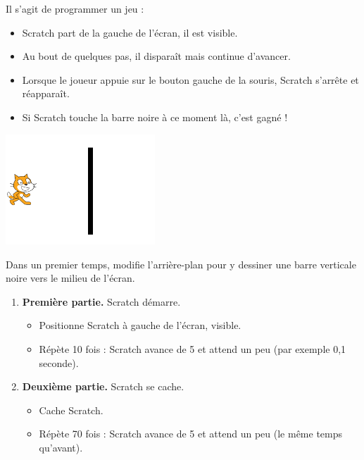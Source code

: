 \documentclass[class=report,crop=false, 12pt]{standalone}
\begin{document}
\begin{activite}

Il s'agit de programmer un jeu : 
\begin{itemize}
  \item Scratch part de la gauche de l'écran, il est visible.
  \item Au bout de quelques pas, il disparaît mais continue d'avancer. 
  \item Lorsque le joueur appuie sur le bouton gauche de la souris, Scratch s'arrête et réapparaît.
  \item Si Scratch touche la barre noire à ce moment là, c'est gagné !
\end{itemize}

\begin{center}
  \includegraphics[width=0.42\textwidth]{ecran-04-ex3} 
\end{center}

Dans un premier temps, modifie l'arrière-plan pour y dessiner une barre verticale noire vers le milieu de l'écran.

\begin{enumerate}
  \item \textbf{Première partie.} Scratch démarre.
  
  \begin{itemize}
    \item Positionne Scratch à gauche de l'écran, visible.
    \item Répète 10 fois : Scratch avance de 5 et attend un peu (par exemple 0,1 seconde). 
  \end{itemize}
  
  
  \item \textbf{Deuxième partie.} Scratch se cache.
  
  \begin{itemize}
    \item Cache Scratch.
    \item Répète 70 fois : Scratch avance de 5 et attend un peu (le même temps qu'avant). 
  \end{itemize}
  

\end{enumerate}
\end{activite}
\end{document}
